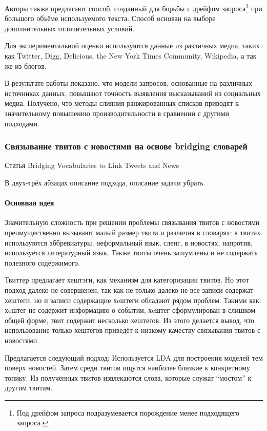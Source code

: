         Авторы также предлагают способ, созданный для борьбы с дрейфом запроса\footnote{Под дрейфом запроса подразумевается порождение менее подходящего запроса.} при большого объёме используемого текста.
        Способ основан на выборе дополнительных отличительных условий.

        Для экспериментальной оценки используются данные из различных медиа, таких как Twitter, Digg, Delicious, the New York Times Community, Wikipedia, а так же из блогов.

        В результате работы показано, что модели запросов, основанные на различных источниках данных, повышают точность выявления высказываний из социальных медиа.
        Получено, что методы слияния ранжированных списков приводят к значительному повышению производительности в сравнении с другими подходами.

    \subsubsection{Связывание твитов с новостями на основе bridging словарей}
        Статья Bridging Vocabularies to Link Tweets and News

        В двух-трёх абзацах описание подхода, описание задачи убрать.

        \paragraph{Основная идея}
            Значительную сложность при решении проблемы связывания твитов с новостями преимущественно вызывают малый размер твита и различия в словарях: в твитах используются аббревиатуры, неформальный язык, сленг, в новостях, напротив, используется литературный язык. Также твиты очень зашумлены и не содержать полезного содержимого.

            Твиттер предлагает хештэги, как механизм для категоризации твитов. Но этот подход далеко не совершенен, так как не только далеко не все записи содержат хештеги, но и записи содержащие хeштеги обладают рядом проблем. Такими как: хeштег не содержит информацию о событии, хeштег сформулирован в слишком общей форме, твит содержит несколько хештегов. Из этого делается вывод, что использование только хештегов приведёт к низкому качеству связывания твитов с новостями.

            Предлагается следующий подход:
            Используется LDA для построения моделей тем поверх новостей. Затем среди твитов ищутся наиболее близкие к конкретному топику. Из полученных твитов извлекаются слова, которые служат ``мостом'' к другим твитам.

